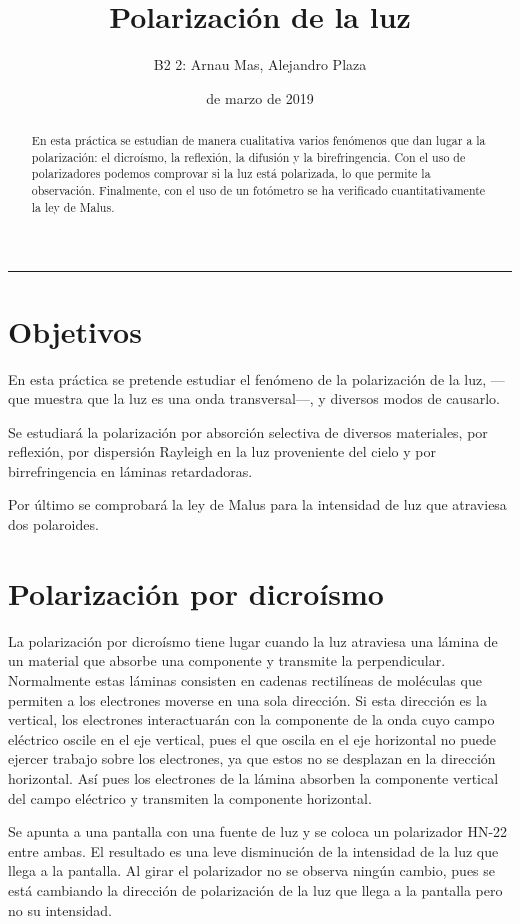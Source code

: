 \documentclass[12pt]{article}
\title{\sffamily {\bfseries Práctica 5:} Polarización de la luz}
\author{\sffamily B2 2: Arnau Mas, Alejandro Plaza}
\date{\sffamily 28 de marzo de 2019}
\numberwithin{table}{section}
\numberwithin{figure}{section}
\numberwithin{equation}{section}
\begin{document}
\maketitle
\renewcommand{\abstractname}{\sffamily \bfseries Resumen:}
\begin{abstract}
	En esta práctica se estudian de manera cualitativa varios fenómenos que dan lugar a la polarización: el dicroísmo, la reflexión, la difusión y la birefringencia. Con el uso de polarizadores podemos comprovar si la luz está polarizada, lo que permite la observación. Finalmente, con el uso de un fotómetro se ha verificado cuantitativamente la ley de Malus.
\end{abstract}
\hrule

\section{Objetivos}
En esta práctica se pretende estudiar el fenómeno de la polarización de la luz, ---que muestra que la luz es una onda transversal---, y diversos modos de causarlo.

Se estudiará la polarización por absorción selectiva de diversos materiales, por reflexión, por dispersión Rayleigh en la luz proveniente del cielo y por birrefringencia en láminas retardadoras.

Por último se comprobará la ley de Malus para la intensidad de luz que atraviesa dos polaroides.

\section{Polarización por dicroísmo}
La polarización por dicroísmo tiene lugar cuando la luz atraviesa una lámina de un material que absorbe una componente y transmite la perpendicular. Normalmente estas láminas consisten en cadenas rectilíneas de moléculas que permiten a los electrones moverse en una sola dirección. Si esta dirección es la vertical, los electrones interactuarán con la componente de la onda cuyo campo eléctrico oscile en el eje vertical, pues el que oscila en el eje horizontal no puede ejercer trabajo sobre los electrones, ya que estos no se desplazan en la dirección horizontal. Así pues los electrones de la lámina absorben la componente vertical del campo eléctrico y transmiten la componente horizontal.

Se apunta a una pantalla con una fuente de luz y se coloca un polarizador HN-22 entre ambas. El resultado es una leve disminución de la intensidad de la luz que llega a la pantalla. Al girar el polarizador no se observa ningún cambio, pues se está cambiando la dirección de polarización de la luz que llega a la pantalla pero no su intensidad.
\end{document}
